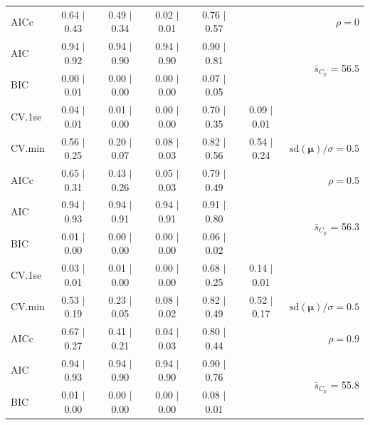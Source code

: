 \documentclass[12pt]{article}
\newcommand{\mr}[1]{\mathrm{#1}}
\newcommand{\bm}[1]{\mathbf{#1}}
\begin{document}
\begin{table}[p]
\begin{center}
\begin{tabular}{l*{5}{c}|r}
AICc & 0.64 $\mid$ 0.43 & 0.49 $\mid$ 0.34 & 0.02 $\mid$ 0.01 & 0.76 $\mid$ 0.57 & & $\rho=0$ \\
AIC & 0.94 $\mid$ 0.92 & 0.94 $\mid$ 0.90 & 0.94 $\mid$ 0.90 & 0.90 $\mid$ 0.81 & & \multirow{2}{*}{$\bar{s}_{C_p}$ = 56.5} \\
BIC & 0.00 $\mid$ 0.01 & 0.00 $\mid$ 0.00 & 0.00 $\mid$ 0.00 & 0.07 $\mid$ 0.05 & & \\
 \hline 
CV.1se & 0.04 $\mid$ 0.01 & 0.01 $\mid$ 0.00 & 0.00 $\mid$ 0.00 & 0.70 $\mid$ 0.35 & 0.09 $\mid$ 0.01 &\\
CV.min & 0.56 $\mid$ 0.25 & 0.20 $\mid$ 0.07 & 0.08 $\mid$ 0.03 & 0.82 $\mid$ 0.56 & 0.54 $\mid$ 0.24 &  $\mr{sd}(\bm{\mu})/\sigma=0.5$ \\
AICc & 0.65 $\mid$ 0.31 & 0.43 $\mid$ 0.26 & 0.05 $\mid$ 0.03 & 0.79 $\mid$ 0.49 & & $\rho=0.5$ \\
AIC & 0.94 $\mid$ 0.93 & 0.94 $\mid$ 0.91 & 0.94 $\mid$ 0.91 & 0.91 $\mid$ 0.80 & & \multirow{2}{*}{$\bar{s}_{C_p}$ = 56.3} \\
BIC & 0.01 $\mid$ 0.00 & 0.00 $\mid$ 0.00 & 0.00 $\mid$ 0.00 & 0.06 $\mid$ 0.02 & & \\
 \hline 
CV.1se & 0.03 $\mid$ 0.01 & 0.01 $\mid$ 0.00 & 0.00 $\mid$ 0.00 & 0.68 $\mid$ 0.25 & 0.14 $\mid$ 0.01 &\\
CV.min & 0.53 $\mid$ 0.19 & 0.23 $\mid$ 0.05 & 0.08 $\mid$ 0.02 & 0.82 $\mid$ 0.49 & 0.52 $\mid$ 0.17 &  $\mr{sd}(\bm{\mu})/\sigma=0.5$ \\
AICc & 0.67 $\mid$ 0.27 & 0.41 $\mid$ 0.21 & 0.04 $\mid$ 0.03 & 0.80 $\mid$ 0.44 & & $\rho=0.9$ \\
AIC & 0.94 $\mid$ 0.93 & 0.94 $\mid$ 0.90 & 0.94 $\mid$ 0.90 & 0.90 $\mid$ 0.76 & & \multirow{2}{*}{$\bar{s}_{C_p}$ = 55.8} \\
BIC & 0.01 $\mid$ 0.00 & 0.00 $\mid$ 0.00 & 0.00 $\mid$ 0.00 & 0.08 $\mid$ 0.01 & & \\
 \hline 
 \end{tabular}
\end{center}
\vspace{-1cm}
\end{table}
\end{document}
